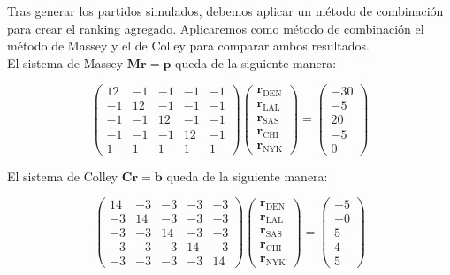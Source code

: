 \begin{ejemplo}
Tras generar los partidos simulados, debemos aplicar un método de combinación para crear el ranking agregado. Aplicaremos como método de combinación el método de Massey y el de Colley para comparar ambos resultados.\\

El sistema de Massey $\mathbf{M r} = \mathbf{p}$ queda de la siguiente manera:

\begin{equation*}
\left(\begin{array}{rrrrr}
12 & -1 & -1 & -1 & -1 \\
-1 & 12 & -1 & -1 & -1 \\
-1 & -1 & 12 & -1 & -1 \\
-1 & -1 & -1 & 12 & -1 \\
 1 &  1 &  1 &  1 &  1
\end{array}\right)
\left(\begin{array}{c}
\mathbf{r}_\text{DEN}\\
\mathbf{r}_\text{LAL}\\
\mathbf{r}_\text{SAS}\\
\mathbf{r}_\text{CHI}\\
\mathbf{r}_\text{NYK}
\end{array}\right)
= 
\left(\begin{array}{c}
-30\\
-5\\
20\\
-5\\
0
\end{array}\right)
\end{equation*}

El sistema de Colley $\mathbf{C r} = \mathbf{b}$ queda de la siguiente manera:

\begin{equation*}
\left(\begin{array}{rrrrr}
14 & -3 & -3 & -3 & -3 \\
-3 & 14 & -3 & -3 & -3 \\
-3 & -3 & 14 & -3 & -3 \\
-3 & -3 & -3 & 14 & -3 \\
-3 & -3 & -3 & -3 & 14
\end{array}\right)
\left(\begin{array}{c}
\mathbf{r}_\text{DEN}\\
\mathbf{r}_\text{LAL}\\
\mathbf{r}_\text{SAS}\\
\mathbf{r}_\text{CHI}\\
\mathbf{r}_\text{NYK}
\end{array}\right)
= 
\left(\begin{array}{c}
-5\\
-0\\
5\\
4\\
5
\end{array}\right)
\end{equation*}


\end{ejemplo}
